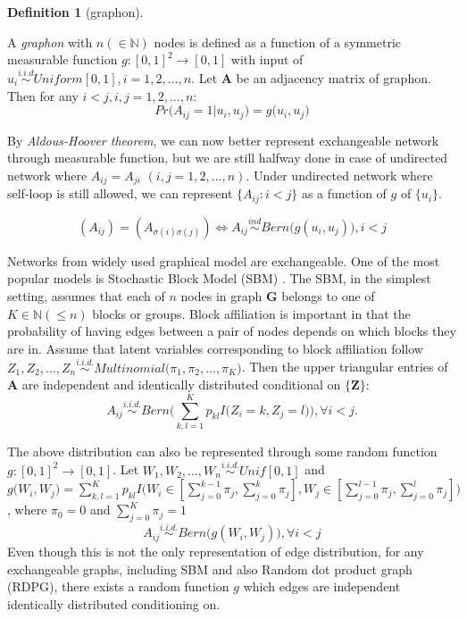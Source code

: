 \documentclass[12pt]{article}
\theoremstyle{definition}
\newtheorem{definition}{Definition}[section]
\begin{document}
\begin{definition}[graphon]
		\label{graphon}
		
		A \textit{graphon} with $n (\in \mathbb{N})$ nodes is defined as a function of a symmetric measurable function $g : [0,1]^2 \rightarrow [0,1]$ with input of $u_{i} \overset{i.i.d}{\sim} Uniform[0,1], i = 1,2,... ,n$. 
		Let $\mathbf{A}$ be an adjacency matrix of graphon. Then for any $i < j, i,j=1,2,...,n$:	
\begin{equation}
	Pr \big(   A_{ij} = 1 \big| u_{i}, u_{j} \big) = g \big(  u_{i}, u_{j} \big)
\end{equation}
\end{definition}
By \textit{Aldous-Hoover theorem}, we can now better represent exchangeable network through measurable function, but we are still halfway done in case of undirected network where $A_{ij} = A_{ji}$  $(i,j=1,2,... , n)$.  Under undirected network where self-loop is still allowed, we can represent $\{ A_{ij} : i < j \}$ as a function of $g$ of $\{ u_{i}\}$. 
	
\begin{equation}
( A_{ij} )  =  (   A_{\sigma(i) \sigma(j)}  ) \Longleftrightarrow A_{ij} \overset{ind}{\sim} Bern\big(  g(u_{i}, u_{j}) \big), i < j
\end{equation}  
	
Networks from widely used graphical model are exchangeable. One of the most popular models is Stochastic Block Model (SBM) \cite{holland1983stochastic}. 
The SBM, in the simplest setting, assumes that each of $n$ nodes in graph $\boldsymbol{G}$ belongs to one of $K \in \mathbb{N} (\leq n)$ blocks or groups. Block affiliation is important in that the probability of having edges between a pair of nodes depends on which blocks they are in.  Assume that latent variables corresponding to block affiliation follow $Z_{1}, Z_{2}, ... , Z_{n} \overset{i.i.d.}{\sim} Multinomial\big( \pi_{1}, \pi_{2}, ... , \pi_{K} \big)$. Then the upper triangular entries of $\mathbf{A}$ are independent and identically distributed conditional on $\{\mathbf{Z}\}$:
	\begin{equation} 
	A_{ij} \overset{i.i.d.}{\sim} Bern\big( \sum\limits_{k,l=1}^{K} p_{kl} I\big( Z_{i} = k, Z_{j} = l  \big)    \big), \forall  i < j.
	\end{equation}

The above distribution can also be represented through some random function $g : [0,1]^2 \rightarrow [0,1]$. Let $W_{1}, W_{2}, ... , W_{n} \overset{i.i.d.}{\sim} Unif[0,1]$ and $g\big( W_{i}, W_{j} \big) = \sum\limits_{k,l=1}^{K} p_{kl} I \big( W_{i} \in [\sum\limits_{j=0}^{k-1} \pi_{j}, \sum\limits_{j=0}^{k} \pi_{j}   ] , W_{j} \in [\sum\limits_{j=0}^{l-1} \pi_{j}, \sum\limits_{j=0}^{l} \pi_{j}  ]  \big)$, where $\pi_{0} = 0$ and $\sum\limits_{j=0}^{K}  \pi_{j} = 1$ 
\begin{equation} 
A_{ij} \overset{i.i.d.}{\sim} Bern \big( g(W_{i}, W_{j})  \big), \forall i < j
\end{equation}
Even though this is not the only representation of edge distribution, for any exchangeable graphs, including SBM and also Random dot product graph (RDPG), there exists a random function $g$ which edges are independent identically distributed conditioning on.
	
\end{document}
